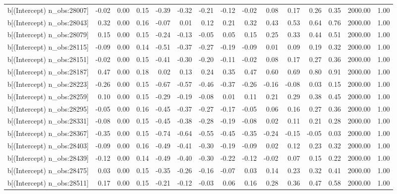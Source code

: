 \begin{table}[ht]
\begin{tabular}{rrrrrrrrrrrrrrr}
  b[(Intercept) n\_obs:28007] & -0.02 & 0.00 & 0.15 & -0.39 & -0.32 & -0.21 & -0.12 & -0.02 & 0.08 & 0.17 & 0.26 & 0.35 & 2000.00 & 1.00 \\ 
  b[(Intercept) n\_obs:28043] & 0.32 & 0.00 & 0.16 & -0.07 & 0.01 & 0.12 & 0.21 & 0.32 & 0.43 & 0.53 & 0.64 & 0.76 & 2000.00 & 1.00 \\ 
  b[(Intercept) n\_obs:28079] & 0.15 & 0.00 & 0.15 & -0.24 & -0.13 & -0.05 & 0.05 & 0.15 & 0.25 & 0.33 & 0.44 & 0.51 & 2000.00 & 1.00 \\ 
  b[(Intercept) n\_obs:28115] & -0.09 & 0.00 & 0.14 & -0.51 & -0.37 & -0.27 & -0.19 & -0.09 & 0.01 & 0.09 & 0.19 & 0.32 & 2000.00 & 1.00 \\ 
  b[(Intercept) n\_obs:28151] & -0.02 & 0.00 & 0.15 & -0.41 & -0.30 & -0.20 & -0.11 & -0.02 & 0.08 & 0.17 & 0.27 & 0.36 & 2000.00 & 1.00 \\ 
  b[(Intercept) n\_obs:28187] & 0.47 & 0.00 & 0.18 & 0.02 & 0.13 & 0.24 & 0.35 & 0.47 & 0.60 & 0.69 & 0.80 & 0.91 & 2000.00 & 1.00 \\ 
  b[(Intercept) n\_obs:28223] & -0.26 & 0.00 & 0.15 & -0.67 & -0.57 & -0.46 & -0.37 & -0.26 & -0.16 & -0.08 & 0.03 & 0.15 & 2000.00 & 1.00 \\ 
  b[(Intercept) n\_obs:28259] & 0.10 & 0.00 & 0.15 & -0.29 & -0.19 & -0.08 & 0.01 & 0.11 & 0.21 & 0.29 & 0.38 & 0.45 & 2000.00 & 1.00 \\ 
  b[(Intercept) n\_obs:28295] & -0.05 & 0.00 & 0.16 & -0.45 & -0.37 & -0.27 & -0.17 & -0.05 & 0.06 & 0.16 & 0.27 & 0.36 & 2000.00 & 1.00 \\ 
  b[(Intercept) n\_obs:28331] & -0.08 & 0.00 & 0.15 & -0.45 & -0.38 & -0.28 & -0.19 & -0.08 & 0.02 & 0.11 & 0.21 & 0.28 & 2000.00 & 1.00 \\ 
  b[(Intercept) n\_obs:28367] & -0.35 & 0.00 & 0.15 & -0.74 & -0.64 & -0.55 & -0.45 & -0.35 & -0.24 & -0.15 & -0.05 & 0.03 & 2000.00 & 1.00 \\ 
  b[(Intercept) n\_obs:28403] & -0.09 & 0.00 & 0.16 & -0.49 & -0.41 & -0.30 & -0.19 & -0.09 & 0.02 & 0.12 & 0.23 & 0.32 & 2000.00 & 1.00 \\ 
  b[(Intercept) n\_obs:28439] & -0.12 & 0.00 & 0.14 & -0.49 & -0.40 & -0.30 & -0.22 & -0.12 & -0.02 & 0.07 & 0.15 & 0.22 & 2000.00 & 1.00 \\ 
  b[(Intercept) n\_obs:28475] & 0.03 & 0.00 & 0.15 & -0.35 & -0.26 & -0.16 & -0.07 & 0.03 & 0.14 & 0.23 & 0.32 & 0.41 & 2000.00 & 1.00 \\ 
  b[(Intercept) n\_obs:28511] & 0.17 & 0.00 & 0.15 & -0.21 & -0.12 & -0.03 & 0.06 & 0.16 & 0.28 & 0.36 & 0.47 & 0.58 & 2000.00 & 1.00 \\ 

\end{tabular}
\end{table}
